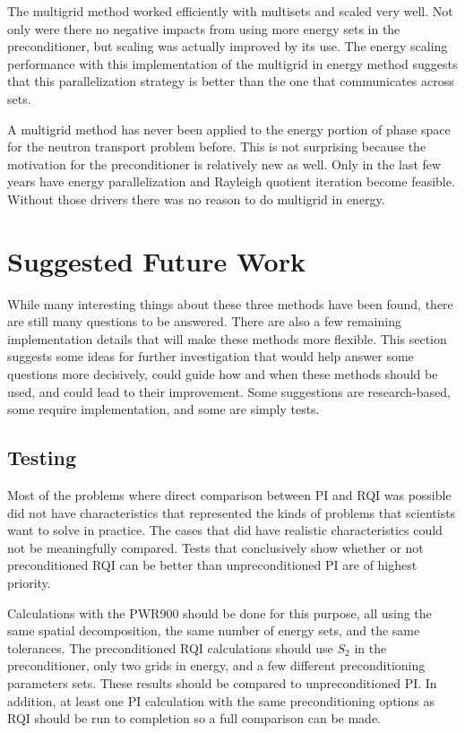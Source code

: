 The multigrid method worked efficiently with multisets and scaled very well. %
%
Not only were there no negative impacts from using more energy sets in the preconditioner, but scaling was actually improved by its use. The energy scaling performance with this implementation of the multigrid in energy method suggests that this parallelization strategy is better than the one that communicates across sets. 

A multigrid method has never been applied to the energy portion of phase space for the neutron transport problem before. This is not surprising because the motivation for the preconditioner is relatively new as well. Only in the last few years have energy parallelization and Rayleigh quotient iteration become feasible. Without those drivers there was no reason to do multigrid in energy.

\section{Suggested Future Work}
While many interesting things about these three methods have been found, there are still many questions to be answered. There are also a few remaining implementation details that will make these methods more flexible. This section suggests some ideas for further investigation that would help answer some questions more decisively, could guide how and when these methods should be used, and could lead to their improvement. Some suggestions are research-based, some require implementation, and some are simply tests.

\subsection{Testing}
Most of the problems where direct comparison between PI and RQI was possible did not have characteristics that represented the kinds of problems that scientists want to solve in practice. The cases that did have realistic characteristics could not be meaningfully compared. Tests that conclusively show whether or not preconditioned RQI can be better than unpreconditioned PI are of highest priority.

Calculations with the PWR900 should be done for this purpose, all using the same spatial decomposition, the same number of energy sets, and the same tolerances. The preconditioned RQI calculations should use $S_{2}$ in the preconditioner, only two grids in energy, and a few different preconditioning parameters sets. These results should be compared to unpreconditioned PI. In addition, at least one PI calculation with the same preconditioning options as RQI should be run to completion so a full comparison can be made. 

